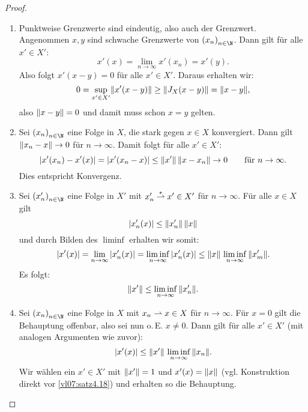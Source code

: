 \begin{proof}%
    \begin{enumerate}[(1)]
        \item 
            Punktweise Grenzwerte sind eindeutig, also auch der \schwachstern
            Grenzwert. Angenommen $x,y$ sind schwache Grenzwerte
            von $\nSeq x$. Dann gilt für alle $x'\in X'$:
            \[ x'(x) = \lim_{n\to\infty} x'(x_n) = x'(y)  . \]
            Also folgt $x'(x-y) = 0$ für alle $x'\in X'$. 
            Daraus erhalten wir:
            \[ 0 = \sup_{x'\in X'} \norm{x'(x-y)}
                \geq \norm{J_X(x-y)} = \norm{x-y}
            , \]
            also $\norm{x-y} = 0$ und damit muss schon $x=y$ gelten.
            
        \item
            Sei $\nSeq x$ eine Folge in $X$, die stark gegen $x\in X$ konvergiert.
            Dann gilt $\norm{x_n-x}\to0$ für $n\to\infty$. Damit folgt für alle
            $x'\in X'$:
            \[ \abs*{x'(x_n)-x'(x)}
                = \abs*{x'(x_n-x)} \leq \norm{x'} \, \norm{x-x_n}
                \to 0 \fuer n\to\infty
            . \]
            Dies entspricht \schwachstern Konvergenz.
            
        \item
            Sei $\nSeq{x'}$ eine Folge in $X'$ mit $x'_n \weakstarto x'\in X'$
            für $n\to\infty$. Für alle $x\in X$ gilt 
            \[ \abs*{x_n'(x)} \leq \norm{x_n'} \, \norm{x} \] und durch Bilden des
            $\liminf$ erhalten wir somit:
            \[  \abs{x'(x)} = \lim_{n\to\infty} \, \abs{x'_n(x)} 
                = \liminf_{n\to\infty} \, \abs{x'_n(x)}
                \leq  \norm{x}\, \liminf_{n\to\infty} \,
                \norm{x'_m}
            . \]
            Es folgt:
            \[ \norm{x'} \leq \liminf_{n\to\infty} \, \norm{x_n'}   . \]
            
        \item
            Sei $\nSeq x$ eine Folge in $X$ mit $x_n \weakto x\in X$ für
            $n\to\infty$. Für $x=0$ gilt die Behauptung offenbar, also sei nun
            o.\,E. $x\neq 0$. Dann gilt für alle $x'\in X'$ (mit analogen
            Argumenten wie zuvor):
            \[ \abs*{x'(x)} \leq \norm{x'} \, \liminf_{n\to\infty} \, \norm{x_n}
            . \]
            Wir wählen ein $x'\in X'$ mit $\norm{x'}=1$ und $x'(x)=\norm{x}$
            (vgl. Konstruktion direkt vor \cref{vl07:satz4.18}) und erhalten so
            die Behauptung.
            

\end{enumerate}
\end{proof}
